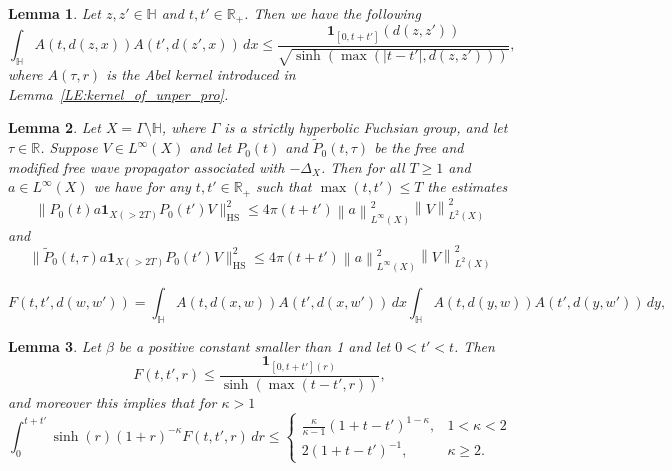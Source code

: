 \documentclass[10pt,a4paper]{amsart}
\newtheorem{lemma}{Lemma}
\newcommand{\R}{\mathbb{R}}
\newcommand{\bH}{\mathbb{H}}
\newcommand{\bHS}{\mathrm{HS}}
\newcommand{\norm}[1]{\left\lVert#1\right\rVert}
\begin{document}
\begin{lemma}\label{LE:Two_abel_kernel_int_est}
Let $z,z'\in\bH$ and $t,t'\in \R_{+}$. Then we have the following
\begin{equation*}
    \int_{\bH} A(t,d(z,x))A(t',d(z',x)) \, d x \leq \frac{ \boldsymbol{1}_{[0,t+t']}(d(z,z'))}{\sqrt{\sinh (\max(|t-t'|,d(z,z')))}},
\end{equation*}
where $A(\tau,r)$ is the Abel kernel introduced in Lemma~\ref{LE:kernel_of_unper_pro}.
\end{lemma}

\begin{lemma}\label{LE:Potential_restriction_1}
Let $X=\Gamma\setminus \bH$, where $\Gamma$ is a strictly hyperbolic Fuchsian group, and let $\tau\in\R$. Suppose $V\in L^\infty(X)$ and let $P_0(t)$ and $\widetilde{P}_0(t,\tau)$ be the free and modified free wave propagator associated with $-\Delta_X$. Then for all $T\geq 1$ and $a\in L^\infty(X)$ we have for any $t,t'\in \R_{+}$ such that $\max(t,t')\leq T$ the estimates
%
\begin{equation*}
       \big\lVert  P_0(t) a \boldsymbol{1}_{X( > 2T)} P_0(t') V  \big\rVert_{\bHS}^2 \leq  4\pi (t+t') \norm{a}_{L^\infty(X)}^2 \norm{V}_{L^2(X)}^2
\end{equation*}
and
\begin{equation*}
       \big\lVert  \widetilde{P}_0(t,\tau) a \boldsymbol{1}_{X( > 2T)} P_0(t') V  \big\rVert_{\bHS}^2 \leq  4\pi (t+t') \norm{a}_{L^\infty(X)}^2 \norm{V}_{L^2(X)}^2
\end{equation*}
\end{lemma}

\begin{equation}\label{def_of_F}
   F(t,t',d(w,w')) = \int_{\bH} A(t,d(x,w))   A(t',d(x,w'))  \,d x \int_{\bH}    A(t,d(y,w))   A(t',d(y,w'))  \,d y,
\end{equation} 

\begin{lemma}\label{LE:int_est_after_exp_mix}
    Let $\beta$ be a positive constant smaller than 1 and let $0<t'<t$. Then
    \begin{equation}\label{LEEQ:int_est_after_exp_mix_1}
       F(t,t',r)\leq \frac{\boldsymbol{1}_{[0,t+t'](r)}}{\sinh(\max(t-t',r))},
    \end{equation}
    and moreover this implies that for $\kappa>1$
    \begin{equation}\label{LEEQ:int_est_after_exp_mix_2}
        \int_{0}^{t+t'} \sinh(r) (1+r)^{-\kappa}   F(t,t',r)\, d r \leq \begin{cases} \frac{\kappa}{\kappa-1}(1+t-t')^{1-\kappa}, & 1 < \kappa < 2 \\ 
        2(1+t-t')^{-1},& \kappa \geq 2.
        \end{cases}
    \end{equation}
\end{lemma}
\end{document}
